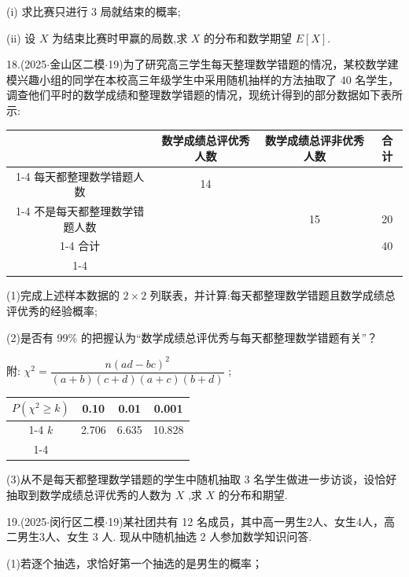(i) 求比赛只进行 3 局就结束的概率;

(ii) 设 $X$ 为结束比赛时甲赢的局数,求 $X$ 的分布和数学期望 $E\left\lbrack  X\right\rbrack$.

18.(2025$\cdot$金山区二模$\cdot$19)为了研究高三学生每天整理数学错题的情况，某校数学建模兴趣小组的同学在本校高三年级学生中采用随机抽样的方法抽取了 40 名学生，调查他们平时的数学成绩和整理数学错题的情况，现统计得到的部分数据如下表所示:

\begin{center}

\begin{tabular}{|c|c|c|c|}
\hline
\phantom{X} & 数学成绩总评优秀人数 & 数学成绩总评非优秀人数 & 合计 \\
\cline{1-4}
每天都整理数学错题人数 & 14 & \phantom{X} & \phantom{X} \\
\cline{1-4}
不是每天都整理数学错题人数 & \phantom{X} & 15 & 20 \\
\cline{1-4}
合计 & \phantom{X} & \phantom{X} & 40 \\
\cline{1-4}
\hline
\end{tabular}
\end{center}

(1)完成上述样本数据的 $2 \times  2$ 列联表，并计算:每天都整理数学错题且数学成绩总评优秀的经验概率;

(2)是否有 99\% 的把握认为“数学成绩总评优秀与每天都整理数学错题有关”？

附: ${\chi }^{2} = \dfrac{n{\left( ad - bc\right) }^{2}}{\left( {a + b}\right) \left( {c + d}\right) \left( {a + c}\right) \left( {b + d}\right) }$ ;

\begin{center}

\begin{tabular}{|c|c|c|c|}
\hline
$P\left( {{\chi }^{2} \geq  k}\right)$ & 0.10 & 0.01 & 0.001 \\
\cline{1-4}
$k$ & 2.706 & 6.635 & 10.828 \\
\cline{1-4}
\hline
\end{tabular}
\end{center}

(3)从不是每天都整理数学错题的学生中随机抽取 3 名学生做进一步访谈，设恰好抽取到数学成绩总评优秀的人数为 $X$ ,求 $X$ 的分布和期望.

19.(2025$\cdot$闵行区二模$\cdot$19)某社团共有 12 名成员，其中高一男生2人、女生4人，高二男生3人、女生 3 人. 现从中随机抽选 2 人参加数学知识问答.

(1)若逐个抽选，求恰好第一个抽选的是男生的概率；

